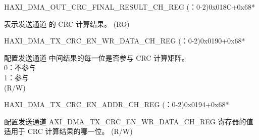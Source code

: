 \begin{register}{H}{AXI\_DMA\_OUT\_CRC\_FINAL\_RESULT\_CH\_REG (：0-2)}{0x018C+0x68*}\label{regdesc:AXIDMAOUTCRCFINALRESULTCHNREG}
%
\regnewline%
\begin{regdesc}\begin{reglist}
\label{fielddesc:AXIDMAOUTCRCFINALRESULTCHN}\item [AXI\_DMA\_OUT\_CRC\_FINAL\_RESULT\_CH\regindex{n}] 表示发送通道  的 CRC 计算结果。 (RO)
\end{reglist}\end{regdesc}
\end{register}


\begin{register}{H}{AXI\_DMA\_TX\_CRC\_EN\_WR\_DATA\_CH\_REG (：0-2)}{0x0190+0x68*}\label{regdesc:AXIDMATXCRCENWRDATACHNREG}
%
\regnewline%
\begin{regdesc}\begin{reglist}
\label{fielddesc:AXIDMATXCRCENWRDATACHN}\item [AXI\_DMA\_TX\_CRC\_EN\_WR\_DATA\_CH\regindex{n}] 配置发送通道  中间结果的每一位是否参与 CRC 计算矩阵。\\
0：不参与\\
1：参与\\ (R/W)
\end{reglist}\end{regdesc}
\end{register}


\begin{register}{H}{AXI\_DMA\_TX\_CRC\_EN\_ADDR\_CH\_REG (：0-2)}{0x0194+0x68*}\label{regdesc:AXIDMATXCRCENADDRCHNREG}
%
\regnewline%
\begin{regdesc}\begin{reglist}
\label{fielddesc:AXIDMATXCRCENADDRCHN}\item [AXI\_DMA\_TX\_CRC\_EN\_ADDR\_CH\regindex{n}] 配置发送通道  AXI\_DMA\_TX\_CRC\_EN\_WR\_DATA\_CH\_REG 寄存器的值适用于 CRC 计算结果的哪一位。 (R/W)
\end{reglist}\end{regdesc}
\end{register}


